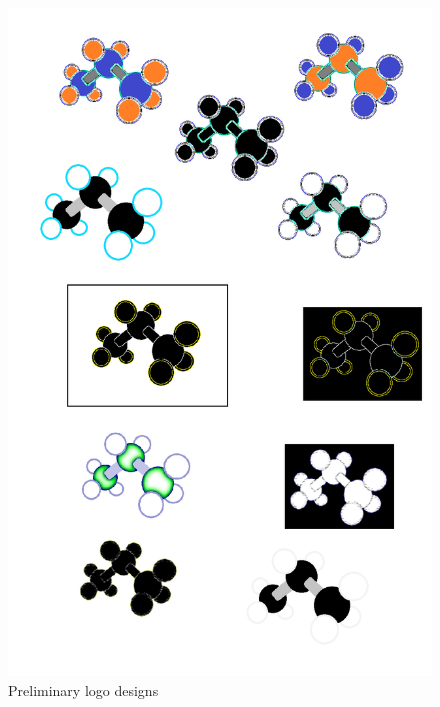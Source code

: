 \documentclass[]{article}
\begin{document}
\begin{figure}[H]
\begin{minipage}[b]{0.45\linewidth}
\centering
\includegraphics[scale=0.22]{images/logo_options}
\caption{Preliminary logo designs}
\end{minipage}
\begin{minipage}[b]{0.45\linewidth}
\centering

\end{minipage}
\end{figure}
\end{document}
